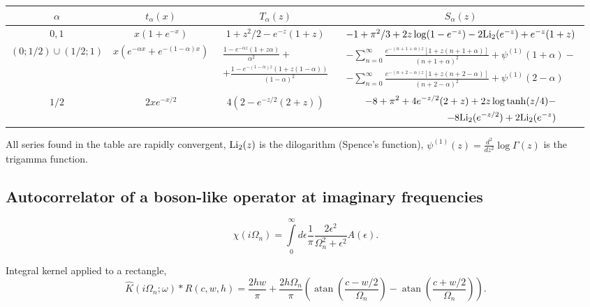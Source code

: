 \documentclass[]{article}
\DeclareMathOperator{\atan}{atan}
\begin{document}
\begin{center}
	\footnotesize
	\begin{tabular}{|c|c|c|c|}
		\hline
		$\alpha$ & $t_\alpha(x)$ & $T_\alpha(z)$ & $S_\alpha(z)$ \\
		\hline
		$0,1$ & $x(1+e^{-x})$ & $1+z^2/2-e^{-z}(1+z)$ &
		$-1+\pi^2/3+2z\log(1-e^{-z})-2\mathrm{Li}_2(e^{-z})+e^{-z}(1+z)$ \\
		\hline
		$(0;1/2)\cup(1/2;1)$ & $x(e^{-\alpha x}+e^{-(1-\alpha)x})$ &
		$\begin{array}{c}\frac{1-e^{-\alpha z}(1+z\alpha)}{\alpha^2}+\\+
		\frac{1-e^{-(1-\alpha) z}(1+z(1-\alpha))}{(1-\alpha)^2}\end{array}$ &$\begin{aligned}-\sum_{n=0}^\infty\frac{e^{-(n+1+\alpha)z}[1+z(n+1+\alpha)]}
		{(n+1+\alpha)^2} +\psi^{(1)}(1+\alpha) -\\
		-\sum_{n=0}^\infty\frac{e^{-(n+2-\alpha)z}[1+z(n+2-\alpha)]}
		{(n+2-\alpha)^2} +\psi^{(1)}(2-\alpha)\end{aligned}$ \\
		\hline
		$1/2$ & $2xe^{-x/2}$ & $4(2-e^{-z/2}(2+z))$ &
		$\begin{aligned}-8+\pi^2+4e^{-z/2}(2+z)+2z\log\tanh(z/4)-\\
		-8\mathrm{Li}_2(e^{-z/2})+2\mathrm{Li}_2(e^{-z})\end{aligned}$ \\
		\hline
	\end{tabular}
\end{center}

All series found in the table are rapidly convergent, $\mathrm{Li}_2(z)$ is the dilogarithm (Spence's function),
$\psi^{(1)}(z) = \frac{d^2}{dz^2}\log\Gamma(z)$ is the trigamma function.

\subsection{Autocorrelator of a boson-like operator at imaginary frequencies}
\label{bosonautocorr_imfreq}
\begin{equation}
\chi(i\Omega_n) = \int\limits_0^\infty
d\epsilon \frac{1}{\pi}\frac{2\epsilon^2}{\Omega_n^2+\epsilon^2} A(\epsilon).
\end{equation}

Integral kernel applied to a rectangle,
\begin{equation}
\hat K(i\Omega_n;\omega)*R(c,w,h) =
\frac{2hw}{\pi} + \frac{2h\Omega_n}{\pi}\left(
\atan\left(\frac{c-w/2}{\Omega_n}\right) - \atan\left(\frac{c+w/2}{\Omega_n}\right)
\right).
\end{equation}
\end{document}
